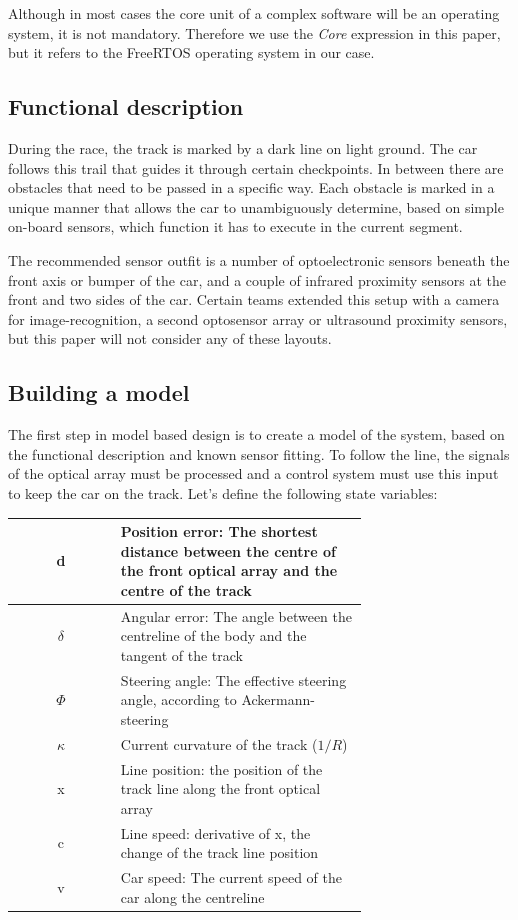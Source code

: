 Although in most cases the core unit of a complex software will be an operating system, it is not mandatory. Therefore we use the \emph{Core} expression in this paper, but it refers to the FreeRTOS operating system in our case.

\subsection{Functional description}

During the race, the track is marked by a dark line on light ground. The car follows this trail that guides it through certain checkpoints. In between there are obstacles that need to be passed in a specific way. Each obstacle is marked in a unique manner that allows the car to unambiguously determine, based on simple on-board sensors, which function it has to execute in the current segment.

The recommended sensor outfit\cite{sensors} is a number of optoelectronic sensors beneath the front axis or bumper of the car, and a couple of infrared proximity sensors at the front and two sides of the car. Certain teams extended this setup with a camera for image-recognition, a second optosensor array or ultrasound proximity sensors, but this paper will not consider any of these layouts.

\subsection{Building a model}

The first step in model based design is to create a model of the system, based on the functional description and known sensor fitting. To follow the line, the signals of the optical array must be processed and a control system must use this input to keep the car on the track. Let's define the following state variables:

\begin{center}
  \begin{tabular}{| c | p{0.7\linewidth} |}
\hline
    d & Position error: The shortest distance between the centre of the front optical array and the centre of the track \\ \hline
    $ \delta $ & Angular error: The angle between the centreline of the body and the tangent of the track \\ \hline
    $ \Phi $ & Steering angle: The effective steering angle, according to Ackermann-steering \\
    \hline
    $ \kappa $ & Current curvature of the track ($1/R$) \\ \hline
    x & Line position: the position of the track line along the front optical array \\ \hline
    c & Line speed: derivative of x, the change of the track line position \\ \hline
    v & Car speed: The current speed of the car along the centreline \\
    \hline
  \end{tabular}
\end{center}

